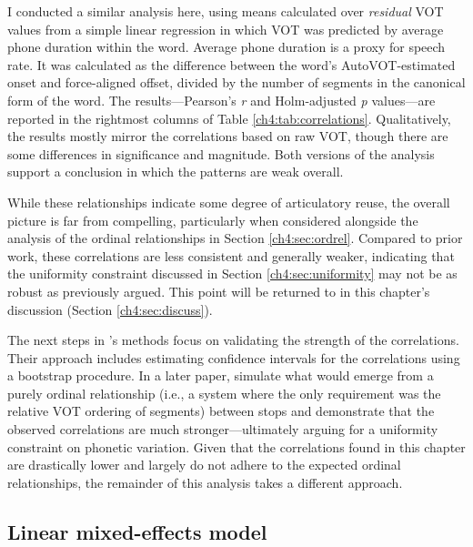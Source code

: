 I conducted a similar analysis here, using means calculated over \textit{residual} VOT values from a simple linear regression in which VOT was predicted by average phone duration within the word. Average phone duration is a proxy for speech rate. It was calculated as the difference between the word's AutoVOT-estimated onset and force-aligned offset, divided by the number of segments in the canonical form of the word. The results---Pearson's \textit{r} and Holm-adjusted \textit{p} values---are reported in the rightmost columns of Table \ref{ch4:tab:correlations}. Qualitatively, the results mostly mirror the correlations based on raw VOT, though there are some differences in significance and magnitude. Both versions of the analysis support a conclusion in which the patterns are weak overall.

While these relationships indicate some degree of articulatory reuse, the overall picture is far from compelling, particularly when considered alongside the analysis of the ordinal relationships in Section \ref{ch4:sec:ordrel}. Compared to prior work, these correlations are less consistent and generally weaker, indicating that the uniformity constraint discussed in Section \ref{ch4:sec:uniformity} may not be as robust as previously argued. This point will be returned to in this chapter's discussion (Section \ref{ch4:sec:discuss}).

The next steps in \citeauthor{chodroff_2017_structure}'s \citeyearpar{chodroff_2017_structure} methods focus on validating the strength of the correlations. Their approach includes estimating confidence intervals for the correlations using a bootstrap procedure. In a later paper, \citet{chodroff_2019_covariation} simulate what would emerge from a purely ordinal relationship (i.e., a system where the only requirement was the relative VOT ordering of segments) between stops and demonstrate that the observed correlations are much stronger---ultimately arguing for a uniformity constraint on phonetic variation. Given that the correlations found in this chapter are drastically lower and largely do not adhere to the expected ordinal relationships, the remainder of this analysis takes a different approach.

\subsection{Linear mixed-effects model}\label{ch4:sec:lmem}

